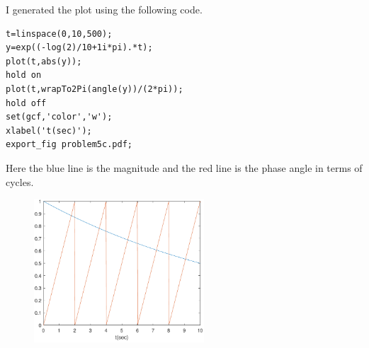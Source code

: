 \documentclass[12pt]{article}
\begin{document}
I generated the plot using the following code.
\begin{verbatim}
t=linspace(0,10,500);
y=exp((-log(2)/10+1i*pi).*t);
plot(t,abs(y));
hold on
plot(t,wrapTo2Pi(angle(y))/(2*pi));
hold off
set(gcf,'color','w');
xlabel('t(sec)');
export_fig problem5c.pdf;
\end{verbatim}
Here the blue line is the magnitude and the red line is the phase angle in terms of cycles.
\begin{figure}[H]
    \begin{center}
        \includegraphics[width=2.5in]{problem5c.pdf}
    \end{center}
\end{figure}
\end{document}
